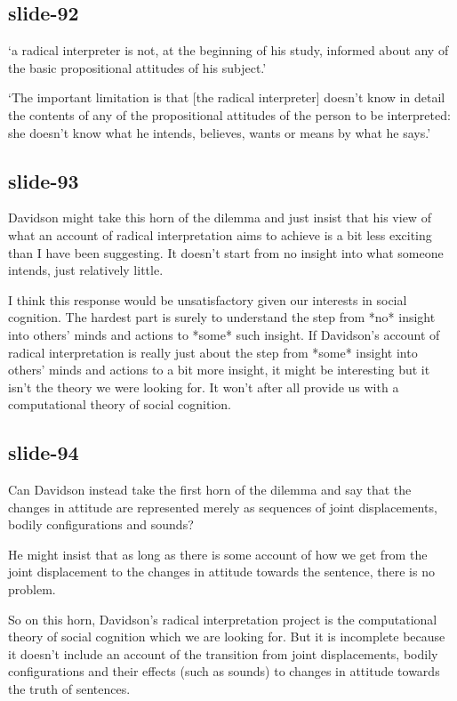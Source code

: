 \documentclass[12pt,\papersize]{extarticle}
\begin{document}
\subsection{slide-92}
‘a radical interpreter is not, at the beginning of his study, informed about
any of the basic propositional attitudes of his subject.’
\citep[p.~17]{Davidson:1984pr}

‘The important limitation is that [the radical interpreter] doesn’t know in
detail the contents of any of the propositional attitudes of the person to
be interpreted: she doesn’t know what he intends, believes, wants or means
by what he says.’ \citep[p.~]{Davidson:1994ff}

\subsection{slide-93}
Davidson might take this horn of the dilemma and just insist that
his view of what an account of radical interpretation aims to achieve
is a bit less exciting than I have been suggesting.
It doesn’t start from no insight into what someone intends, just relatively little.

I think this response would be unsatisfactory given our interests in
social cognition.  The hardest part is surely to understand the step from
*no* insight into others’ minds and actions to *some* such insight.
If Davidson’s account of radical interpretation is really just about
the step from *some* insight into others’ minds and actions to a bit more
insight, it might be interesting but it isn’t the theory we were looking for.
It won’t after all provide us with a computational theory of social cognition.

\subsection{slide-94}
Can Davidson instead take the first horn of the dilemma and say that the changes
in attitude are represented merely as sequences of joint displacements,
bodily configurations and sounds?

He might insist that as long as there is some account of how we get from the
joint displacement to the changes in attitude towards the sentence,
there is no problem.

So on this horn, Davidson’s radical interpretation project is the computational
theory of social cognition which we are looking for.  But it is incomplete because
it doesn’t include an account of the transition from
joint displacements, bodily configurations and their effects (such as sounds)
to changes in attitude towards the truth of sentences.
\end{document}
